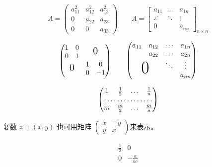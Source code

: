 	\[
	A = \begin{pmatrix}
	a_{11}^2 & a_{12}^2 & a_{13}^2 \\
	0 & a_{22} & a_{23} \\
	0 & 0 & a_{33}
	\end{pmatrix} \qquad	
	A= \begin{bmatrix}
	a_{11} & \dots & a_{1n} \\
	\adots & \ddots & \vdots \\
	0 & & a_{nn}
	\end{bmatrix}_{n \times n}
	\]
	
	\[
	\begin{pmatrix}
	\begin{matrix} 1&0\\0&1\end{matrix}
	& \text{\Large 0} \\
	\text{\Large 0} & \begin{matrix}
	1&0\\0&-1 \end{matrix}
	\end{pmatrix} \qquad
	\begin{pmatrix}
	a_{11} & a_{12} & \cdots & a_{1n} \\
	& a_{22} & \cdots &a_{2n} \\
	&        & \ddots & \vdots \\
	\multicolumn{2}{c}{\raisebox{1.3ex}[0 pt]{\Huge 0}}
	&        &a_{nn}
	\end{pmatrix}
	\]
	
	\[
	\begin{pmatrix}
	1 & \frac 12 & \dots & \frac 1n \\
	\hdotsfor{4} \\
	m & \frac m2 & \dots &\frac mn
	\end{pmatrix}
	\]
	
	复数 $z = (x,y)$ 也可用矩阵
	\begin{math}
	\left(%
	\begin{smallmatrix}
	x & -y \\ y & x
	\end{smallmatrix}
	\right)%
	\end{math}来表示。		
	
	\[
	\begin{array}{r|r}
	\frac12 & 0 \\
	\hline
	0 & -\frac a{bc} \\
	\end{array}
	\]
	
